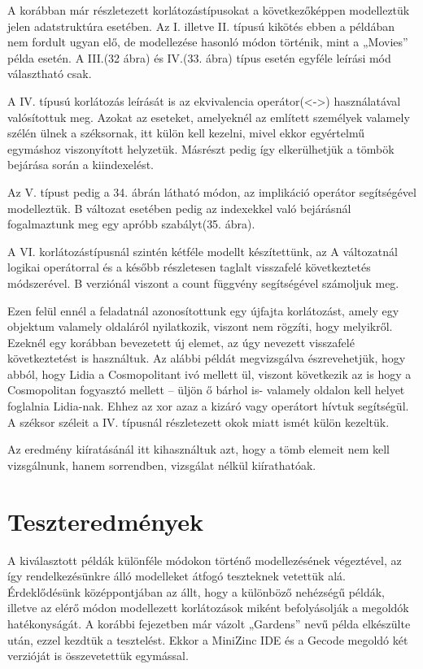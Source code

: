 \documentclass[12pt,a4paper,twoside, openright]{report}
\begin{document}
				
				A korábban már részletezett korlátozástípusokat a következőképpen modelleztük jelen adatstruktúra esetében. Az I. illetve II. típusú kikötés ebben a példában nem fordult ugyan elő, de modellezése hasonló módon történik, mint a „Movies” példa esetén. A III.(32 ábra) és IV.(33. ábra) típus esetén egyféle leírási mód választható csak.
				
				
				A IV. típusú korlátozás leírását is az ekvivalencia operátor(<->) használatával valósítottuk meg. Azokat az eseteket, amelyeknél az említett személyek valamely szélén ülnek a széksornak, itt külön kell kezelni, mivel ekkor egyértelmű egymáshoz viszonyított helyzetük. Másrészt pedig így elkerülhetjük a tömbök bejárása során a 
				kiindexelést. 
				
				
				
				Az V. típust pedig a 34. ábrán látható módon, az implikáció operátor segítségével modelleztük. B változat esetében pedig az indexekkel való bejárásnál fogalmaztunk meg egy apróbb szabályt(35. ábra).
				
				
				A VI. korlátozástípusnál szintén kétféle modellt készítettünk, az A változatnál logikai 
				operátorral és a később részletesen taglalt visszafelé következtetés módszerével. B 
				verziónál viszont a count függvény segítségével számoljuk meg.
				
				
				Ezen felül ennél a feladatnál azonosítottunk egy újfajta korlátozást, amely egy objektum valamely oldaláról nyilatkozik, viszont nem rögzíti, hogy melyikről. Ezeknél egy korábban bevezetett új elemet, az úgy nevezett visszafelé következtetést is használtuk. Az alábbi példát megvizsgálva észrevehetjük, hogy abból, hogy Lidia a Cosmopolitant ivó mellett ül, viszont következik az is hogy a Cosmopolitan fogyasztó mellett – üljön ő bárhol is- valamely oldalon kell helyet foglalnia Lidia-nak. Ehhez az xor azaz a kizáró vagy operátort hívtuk segítségül. A széksor széleit a IV. típusnál részletezett okok miatt ismét külön kezeltük.
				
				
				Az eredmény kiíratásánál itt kihasználtuk azt, hogy a tömb elemeit nem kell vizsgálnunk, hanem sorrendben, vizsgálat nélkül kiírathatóak.
				
				
		\section{Teszteredmények}
			A kiválasztott példák különféle módokon történő modellezésének végeztével, az így rendelkezésünkre álló modelleket átfogó teszteknek vetettük alá. Érdeklődésünk középpontjában az állt, hogy a különböző nehézségű példák, illetve az elérő módon modellezett korlátozások miként befolyásolják a megoldók hatékonyságát.
			A korábbi fejezetben már vázolt „Gardens” nevű példa elkészülte után, ezzel kezdtük a tesztelést. Ekkor a MiniZinc IDE és a Gecode megoldó két verzióját is összevetettük egymással.
			
\end{document}
